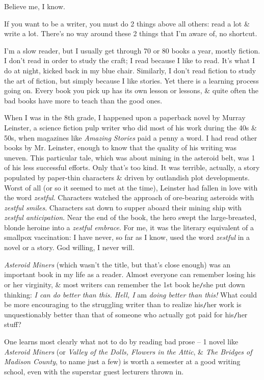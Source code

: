\documentclass{article}
\numberwithin{equation}{section}
\begin{document}
Believe me, I know.

 If you want to be a writer, you must do 2 things above all others: read a lot \& write a lot. There's no way around these 2 things that I'm aware of, no shortcut.

I'm a slow reader, but I usually get through 70 or 80 books a year, mostly fiction. I don't read in order to study the craft; I read because I like to read. It's what I do at night, kicked back in my blue chair. Similarly, I don't read fiction to study the art of fiction, but simply because I like stories. Yet there is a learning process going on. Every book you pick up has its own lesson or lessons, \& quite often the bad books have more to teach than the good ones.

When I was in the 8th grade, I happened upon a paperback novel by Murray Leinster, a science fiction pulp writer who did most of his work during the 40s \& 50s, when magazines like \textit{Amazing Stories} paid a penny a word. I had read other books by Mr. Leinster, enough to know that the quality of his writing was uneven. This particular tale, which was about mining in the asteroid belt, was 1 of his less successful efforts. Only that's too kind. It was terrible, actually, a story populated by paper-thin characters \& driven by outlandish plot developments. Worst of all (or so it seemed to met at the time), Leinster had fallen in love with the word \textit{zestful}. Characters watched the approach of ore-bearing asteroids with \textit{zestful smiles}. Characters sat down to supper aboard their mining ship with \textit{zestful anticipation}. Near the end of the book, the hero swept the large-breasted, blonde heroine into a \textit{zestful embrace}. For me, it was the literary equivalent of a smallpox vaccination: I have never, so far as I know, used the word \textit{zestful} in a novel or a story. God willing, I never will.

\textit{Asteroid Miners} (which wasn't the title, but that's close enough) was an important book in my life as a reader. Almost everyone can remember losing his or her virginity, \& most writers can remember the 1st book he{\tt/}she put down thinking: \textit{I can do better than this. Hell, I} am \textit{doing better than this!} What could be more encouraging to the struggling writer than to realize his{\tt/}her work is unquestionably better than that of someone who actually got paid for his{\tt/}her stuff?

One learns most clearly what not to do by reading bad prose -- 1 novel like \textit{Asteroid Miners} (or \textit{Valley of the Dolls, Flowers in the Attic}, \& \textit{The Bridges of Madison County}, to name just a few) is worth a semester at a good writing school, even with the superstar guest lecturers thrown in.
\end{document}

